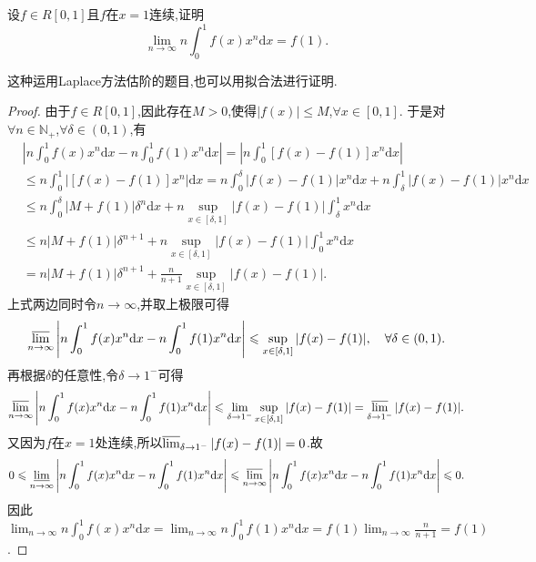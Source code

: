 \documentclass[../../main.tex]{subfiles}
\begin{document}
\begin{example}\label{example4544166848}
设\(f\in R[0,1]\)且\(f\)在\(x = 1\)连续,证明
\[
\lim_{n \to \infty} n\int_{0}^{1} f(x)x^n \mathrm{d}x = f(1).
\]
\end{example}
\begin{note}
这种运用Laplace方法估阶的题目,也可以用拟合法进行证明.
\end{note}
\begin{proof}
由于\(f\in R[0,1]\),因此存在\(M > 0\),使得\(\vert f(x)\vert\leqslant M\),\(\forall x\in [0,1]\).
于是对\(\forall n\in\mathbb{N}_+\),\(\forall\delta\in(0,1)\),有
\begin{align*}
&\left\vert n\int_0^1 f(x)x^n \mathrm{d}x - n\int_0^1 f(1)x^n \mathrm{d}x\right\vert=\left\vert n\int_0^1 [f(x) - f(1)]x^n \mathrm{d}x\right\vert\\
&\leqslant n\int_0^1 \vert [f(x) - f(1)]x^n\vert \mathrm{d}x
=n\int_0^{\delta} \vert f(x) - f(1)\vert x^n \mathrm{d}x + n\int_{\delta}^1 \vert f(x) - f(1)\vert x^n \mathrm{d}x\\
&\leqslant n\int_0^{\delta} \vert M + f(1)\vert\delta^n \mathrm{d}x + n\sup_{x\in[\delta,1]}\vert f(x) - f(1)\vert\int_{\delta}^1 x^n \mathrm{d}x\\
&\leqslant n\vert M + f(1)\vert\delta^{n + 1} + n\sup_{x\in[\delta,1]}\vert f(x) - f(1)\vert\int_0^1 x^n \mathrm{d}x\\
&=n\vert M + f(1)\vert\delta^{n + 1} + \frac{n}{n + 1}\sup_{x\in[\delta,1]}\vert f(x) - f(1)\vert.
\end{align*}
上式两边同时令\(n\rightarrow\infty\),并取上极限可得
\[
\varlimsup_{n\rightarrow\infty}\left\vert n\int_0^1 f(x)x^n \mathrm{d}x - n\int_0^1 f(1)x^n \mathrm{d}x\right\vert\leqslant\sup_{x\in[\delta,1]}\vert f(x) - f(1)\vert, \quad\forall\delta\in(0,1).
\]
再根据\(\delta\)的任意性,令\(\delta\rightarrow 1^-\)可得
\[
\varlimsup_{n\rightarrow\infty}\left\vert n\int_0^1 f(x)x^n \mathrm{d}x - n\int_0^1 f(1)x^n \mathrm{d}x\right\vert\leqslant\lim_{\delta\rightarrow 1^-}\sup_{x\in[\delta,1]}\vert f(x) - f(1)\vert=\varlimsup_{\delta\rightarrow 1^-}\vert f(x) - f(1)\vert.
\]
又因为\(f\)在\(x = 1\)处连续,所以\(\varlimsup_{\delta\rightarrow 1^-}\vert f(x) - f(1)\vert = 0\).故
\[
0\leqslant\varliminf_{n\rightarrow\infty}\left\vert n\int_0^1 f(x)x^n \mathrm{d}x - n\int_0^1 f(1)x^n \mathrm{d}x\right\vert\leqslant\varlimsup_{n\rightarrow\infty}\left\vert n\int_0^1 f(x)x^n \mathrm{d}x - n\int_0^1 f(1)x^n \mathrm{d}x\right\vert\leqslant 0.
\]
因此$\lim_{n\rightarrow\infty}n\int_0^1 f(x)x^n \mathrm{d}x=\lim_{n\rightarrow\infty}n\int_0^1 f(1)x^n \mathrm{d}x = f(1)\lim_{n\rightarrow\infty}\frac{n}{n + 1}=f(1)$.
\end{proof}
\end{document}
